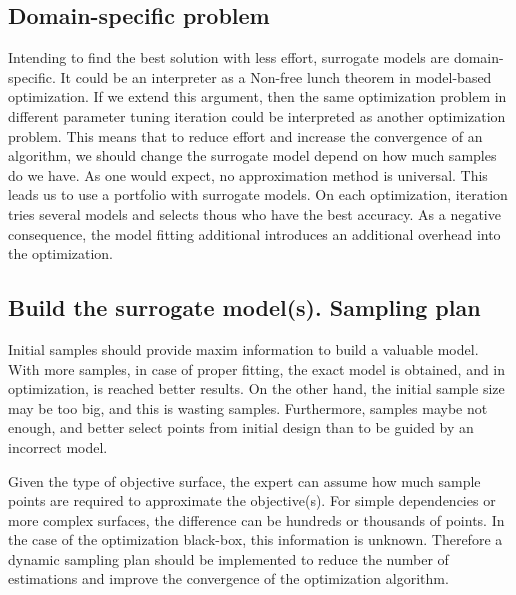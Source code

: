         \subsection{Domain-specific problem}
        Intending to find the best solution with less effort, surrogate models are domain-specific. It could be an interpreter as a Non-free lunch theorem in model-based optimization. If we extend this argument, then the same optimization problem in different parameter tuning iteration could be interpreted as another optimization problem. This means that to reduce effort and increase the convergence of an algorithm, we should change the surrogate model depend on how much samples do we have. As one would expect, no approximation method is universal.
        This leads us to use a portfolio with surrogate models. On each optimization, iteration tries several models and selects thous who have the best accuracy. As a negative consequence, the model fitting additional introduces an additional overhead into the optimization.


        \subsection{Build the surrogate model(s). Sampling plan}
        Initial samples should provide maxim information to build a valuable model. With more samples, in case of proper fitting, the exact model is obtained, and in optimization, is reached better results. On the other hand, the initial sample size may be too big, and this is wasting samples. Furthermore, samples maybe not enough, and better select points from initial design than to be guided by an incorrect model.

        Given the type of objective surface, the expert can assume how much sample points are required to approximate the objective(s). For simple dependencies or more complex surfaces, the difference can be hundreds or thousands of points. In the case of the optimization black-box, this information is unknown. Therefore a dynamic sampling plan should be implemented to reduce the number of estimations and improve the convergence of the optimization algorithm.



